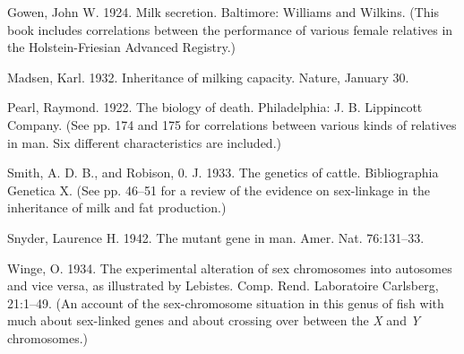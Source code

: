 \begin{hangparas}{0.5in}{1}%
Gowen, John W. 1924. Milk secretion. Baltimore: Williams and Wilkins. (This book
includes correlations between the performance of various female relatives in
the Holstein-Friesian Advanced Registry.)

Madsen, Karl. 1932. Inheritance of milking capacity. Nature, January 30.

Pearl, Raymond. 1922. The biology of death. Philadelphia: J. B. Lippincott Company.
(See pp. 174 and 175 for correlations between various kinds of relatives
in man. Six different characteristics are included.)

Smith, A. D. B., and Robison, 0. J. 1933. The genetics of cattle. Bibliographia
Genetica X. (See pp. 46--51 for a review of the evidence on sex-linkage in the
inheritance of milk and fat production.)

Snyder, Laurence H. 1942. The mutant gene in man. Amer. Nat. 76:131--33.

Winge, O. 1934. The experimental alteration of sex chromosomes into autosomes
and vice versa, as illustrated by Lebistes. Comp. Rend. Laboratoire Carlsberg,
21:1--49. (An account of the sex-chromosome situation in this genus of
fish with much about sex-linked genes and about crossing over between the
\textit{X} and \textit{Y} chromosomes.)
\end{hangparas}
